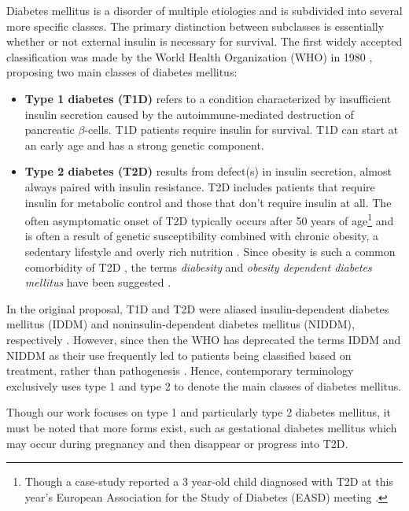Diabetes mellitus is a disorder of multiple etiologies and is subdivided into several more specific classes. The primary distinction between subclasses is essentially whether or not external insulin is necessary for survival. The first widely accepted classification was made by the World Health Organization (WHO) in 1980 \citep{WHO1980}, proposing two main classes of diabetes mellitus:
\begin{itemize}
\item \textbf{Type 1 diabetes (T1D)} refers to a condition characterized by insufficient insulin secretion caused by the autoimmune-mediated destruction of pancreatic $\beta$-cells. T1D patients require insulin for survival. T1D can start at an early age and has a strong genetic component.
\item \textbf{Type 2 diabetes (T2D)} results from defect(s) in insulin secretion, almost always paired with insulin resistance. T2D includes patients that require insulin for metabolic control and those that don't require insulin at all. The often asymptomatic onset of T2D typically occurs after 50 years of age\footnote{Though a case-study reported a 3 year-old child diagnosed with T2D at this year's European Association for the Study of Diabetes (EASD) meeting \citep[``\emph{A toddler with type 2 diabetes}'', pp. 152--153]{3yeardolddiabetic}.} and is often a result of genetic susceptibility combined with chronic obesity, a sedentary lifestyle and overly rich nutrition \citep{zimmet2001global, smyth2006diabetes}. Since obesity is such a common comorbidity of T2D \citep{smyth2006diabetes}, the terms \emph{diabesity} and \emph{obesity dependent diabetes mellitus} have been suggested \citep{shafrir1996development, astrup2000redefining}.
\end{itemize}
In the original proposal, T1D and T2D were aliased insulin-dependent diabetes mellitus (IDDM) and noninsulin-dependent diabetes mellitus (NIDDM), respectively \citep{WHO1980}. However, since then the WHO has deprecated the terms IDDM and NIDDM as their use frequently led to patients being classified based on treatment, rather than pathogenesis \citep{alberti1998definition}. Hence, contemporary terminology exclusively uses type 1 and type 2 to denote the main classes of diabetes mellitus. 

Though our work focuses on type 1 and particularly type 2 diabetes mellitus, it must be noted that more forms exist, such as gestational diabetes mellitus which may occur during pregnancy and then disappear or progress into T2D.

